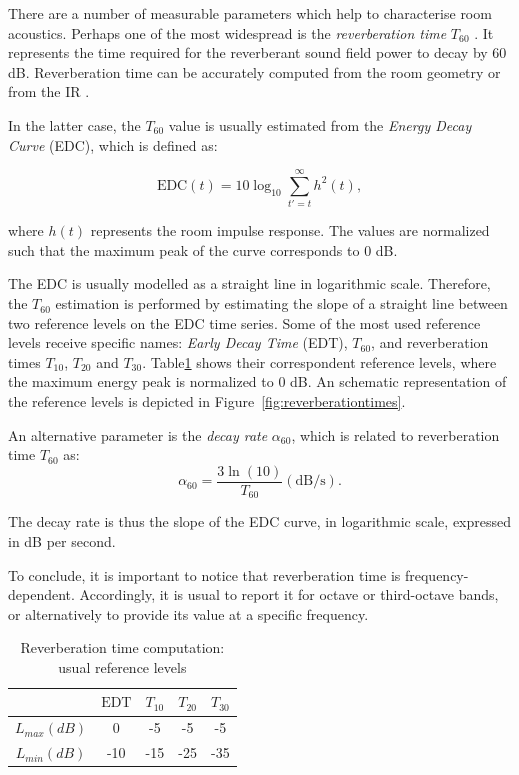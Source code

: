 There are a number of measurable parameters which help to characterise room acoustics. 
Perhaps one of the most widespread is the \textit{reverberation time} $T_{60}$ \cite{kuttruff2016room}. It represents the time required for the reverberant sound field power to decay by 60 dB.
Reverberation time can be accurately computed from the room geometry \cite{sabine1927collected} or from the IR \cite{schroeder1965new}.

In the latter case, the $T_{60}$ value is usually estimated from the \textit{Energy Decay Curve} (EDC), which is defined as:

\begin{equation}
	\text{EDC}(t) = 10 \log_{10} \sum_{t'=t}^{\infty} h^2(t),
\end{equation}

where $h(t)$ represents the room impulse response. The values are normalized such that the maximum peak of the curve corresponds to 0 dB.

The EDC is usually modelled as a straight line in logarithmic scale. Therefore, the $T_{60}$ estimation is performed by estimating the slope of a straight line between two reference levels on the EDC time series.
Some of the most used reference levels receive specific names: \textit{Early Decay Time} (EDT), $T_{60}$, and reverberation times $T_{10}$, $T_{20}$ and $T_{30}$. Table\ref{tab:reverberationtimes} shows their correspondent reference levels, where the maximum energy peak is normalized to 0 dB. An schematic representation of the reference levels is depicted in Figure~\ref{fig:reverberationtimes}.

An alternative parameter is the \textit{decay rate} $\alpha_{60}$, which is related to reverberation time $T_{60}$ as:
\begin{equation}
	\alpha_{60} = \frac{3 \ln{(10)}} {T_{60}} (\text{dB/s}).
\end{equation}
 
The decay rate is thus the slope of the EDC curve, in logarithmic scale, expressed in dB per second.  

To conclude, it is important to notice that reverberation time is frequency-dependent. Accordingly, it is usual to report it for octave or third-octave bands, or alternatively to provide its value at a specific frequency. \\


\begin{table}[t]
\caption{Reverberation time computation: usual reference levels}
\begin{center}
\begin{tabular}{ccccc}
\toprule
   & $\text{EDT}$ & $T_{10}$ & $T_{20}$ & $T_{30}$ \\
\midrule
$L_{max} (dB)$ & 0 & -5 & -5 & -5  \\
$L_{min} (dB)$ & -10 & -15 & -25 & -35 \\
\bottomrule
\end{tabular}
\label{tab:reverberationtimes}
\end{center}
\end{table}

